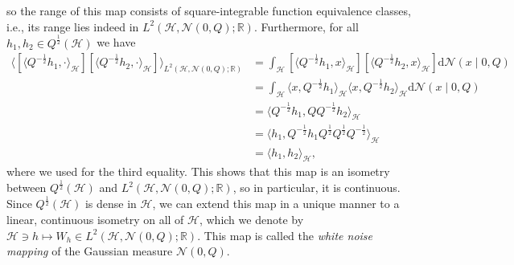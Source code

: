 \documentclass[letterpaper]{article} %
\newcommand{\R}{\mathbb{R}}
\newcommand{\hs}[1]{\mathcal{#1}} %
\newcommand{\Normal}{\mathcal{N}}
\begin{document}
so the range of this map consists of square-integrable function equivalence classes, i.e., its range lies indeed in $L^2(\hs{H},\Normal(0,Q);\R)$.
Furthermore, for all $h_1,h_2\in Q^{\frac12}(\hs{H})$ we have
\begin{align*}
    \langle [\langle Q^{-\frac12}h_1,\cdot\rangle_{\hs{H}}] [\langle Q^{-\frac12}h_2,\cdot\rangle_{\hs{H}}] \rangle_{L^2(\hs{H},\Normal(0,Q);\R)}
    & = \int_\hs{H} [\langle Q^{-\frac12}h_1,x\rangle_{\hs{H}}][\langle Q^{-\frac12}h_2,x\rangle_{\hs{H}}] \mathrm{d}\Normal(x\mid 0,Q) \\
    & = \int_\hs{H} \langle x, Q^{-\frac12}h_1\rangle_{\hs{H}}\langle x, Q^{-\frac12}h_2\rangle_{\hs{H}} \mathrm{d}\Normal(x\mid 0,Q) \\
    & = \langle  Q^{-\frac12}h_1, Q Q^{-\frac12} h_2 \rangle_\hs{H} \\
    & = \langle h_1, Q^{-\frac12}h_1 Q^{\frac12} Q^{\frac12} Q^{-\frac12} \rangle_\hs{H} \\
    & = \langle h_1, h_2 \rangle_\hs{H},
\end{align*}
where we used \cite[Proposition~1.2.4,~(1.2.6)]{daprato2002second} for the third equality.
This shows that this map is an isometry between $Q^{\frac12}(\hs{H})$ and $L^2(\hs{H},\Normal(0,Q);\R)$, so in particular, it is continuous. 
Since $Q^{\frac12}(\hs{H})$ is dense in $\hs{H}$, we can extend this map in a unique manner to a linear, continuous isometry on all of $\hs{H}$,
which we denote by $\hs{H} \ni h \mapsto W_h \in L^2(\hs{H},\Normal(0,Q);\R)$.
This map is called the \emph{white noise mapping} of the Gaussian measure $\Normal(0,Q)$.
\end{document}
